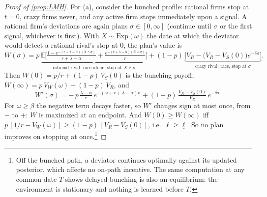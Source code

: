 \documentclass[12pt,reqno]{article}
\newcommand{\Ex}{\mathbb{E}}
\theoremstyle{definition} \newtheorem{example}{Example}
\theoremstyle{definition} \newtheorem{condition}{Condition}
\theoremstyle{definition} \newtheorem{corollary}{Corollary}
\theoremstyle{definition} \newtheorem{claim}{Claim}
\theoremstyle{definition} \newtheorem{definition}{Definition}
\theoremstyle{definition} \newtheorem{conjecture}{Conjecture}
\theoremstyle{definition} \newtheorem{Lemma}{Lemma}
\theoremstyle{definition} \newtheorem{lemma}{Lemma}
\theoremstyle{plain} \newtheorem{theorem}{Theorem}
\theoremstyle{definition} \newtheorem{assumption}{Assumption}
\theoremstyle{definition} \newtheorem*{assumptionnonumber}{Assumption}
\theoremstyle{definition} \newtheorem*{theoremNoNumber}{Proposition}
\theoremstyle{definition}
\theoremstyle{definition}\newtheorem{proposition}{Proposition}
\theoremstyle{definition} \newtheorem{result}{Result}
\theoremstyle{definition} \newtheorem*{definitionNoNumber}{Definition}
\theoremstyle{definition} \newtheorem{Definition}{Definition}
\theoremstyle{definition} \newtheorem*{DefinitionNoNumber}{Definition}
\theoremstyle{definition} \newtheorem*{fact}{Fact}
\theoremstyle{definition} \newtheorem*{property}{Property}
\theoremstyle{definition} \newtheorem{remark}{Remark}
\begin{document}
\begin{proof}[Proof of \cref{prop:LMH}]
For (a), consider the bunched profile: rational firms stop at $t=0$, crazy firms never, and any active firm stops immediately upon a signal. A rational firm's deviations are again plans $\sigma\in[0,\infty]$ (continue until $\sigma$ or the first signal, whichever is first). With $X\sim\mathrm{Exp}(\omega)$ the date at which the deviator would detect a rational rival's stop at $0$, the plan's value is
\[
W(\sigma)=p\,\underbrace{\Ex\Big[\tfrac{1-e^{-(r+\lambda-\alpha)(X\wedge\sigma)}}{r+\lambda-\alpha}+\tfrac{e^{-(r+\lambda-\alpha)(X\wedge\sigma)}}{r}\Big]}_{\text{rational rival: race alone, stop at }X\wedge\sigma}
+(1-p)\,\underbrace{\Big[V_R-\big(V_R-V_S(0)\big)e^{-\delta\sigma}\Big]}_{\text{crazy rival: race, stop at }\sigma} .
\]
Then $W(0)=p/r+(1-p)\,V_S(0)$ is the bunching payoff, $W(\infty)=p\,V_W(\omega)+(1-p)\,V_R$, and
\[
W'(\sigma)=-\,p\,\tfrac{\lambda-\alpha}{r}\,e^{-(\omega+r+\lambda-\alpha)\sigma}+(1-p)\,\tfrac{V_R-V_S(0)}{V_R}\,e^{-\delta\sigma} .
\]
For $\omega\ge\beta$ the negative term decays faster, so $W'$ changes sign at most once, from $-$ to $+$: $W$ is maximized at an endpoint. And $W(0)\ge W(\infty)$ iff $p\,[1/r-V_W(\omega)]\ge(1-p)\,[V_R-V_S(0)]$, i.e.\ $\ell\ge\underline\ell$. So no plan improves on stopping at once.\footnote{Off the bunched path, a deviator continues optimally against its updated posterior, which affects no on-path incentive. The same computation at any common date $T$ shows delayed bunching is also an equilibrium: the environment is stationary and nothing is learned before $T$.}


\end{proof}
\end{document}
